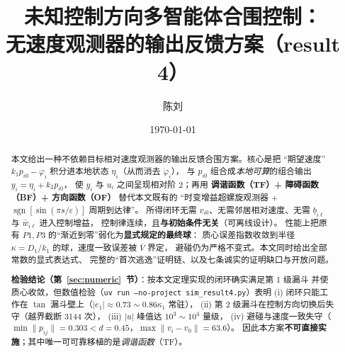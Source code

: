 \documentclass[11pt,a4paper]{article}
\title{\bfseries 未知控制方向多智能体合围控制：\\[2pt]
无速度观测器的输出反馈方案（result 4）}
\author{陈\quad 刘}
\date{\today}
\newcommand{\ub}{\underline{b}}
\newcommand{\sgn}{\operatorname{sgn}}
\theoremstyle{plain}
\theoremstyle{definition}
\theoremstyle{remark}
\begin{document}
\maketitle

\begin{abstract}
\sloppy
本文给出一种不依赖目标相对速度观测器的输出反馈合围方案。核心是把
“期望速度” $k_1p_{i0}-\varphi_i$ 积分进本地状态 $\eta_i$（从而消去 $\dot\varphi_i$），
与 $p_{i0}$ 组合成\emph{本地可算}的组合输出 $y_i=\eta_i+k_2p_{i0}$，
使 $y_i$ 与 $u_i$ 之间呈现相对阶 $2$；再用
\textbf{调谐函数（TF）+ 障碍函数（BF）+ 方向函数（OF）}
替代本文既有的
“时变增益超螺旋观测器 + $\sgn[\sin(\pi s/\varepsilon)]$ 周期到达律”。
所得闭环无需 $v_{i0}$、无需邻居相对速度、无需 $\ub_{i\ell}$ 与 $\bar w_{i\ell}$ 进入控制增益，
控制律连续，且\textbf{与初始条件无关}（可离线设计）。
性能上把原有 $P1,P3$ 的“渐近到零”弱化为\textbf{显式规定的最终球}：
质心误差指数收敛到半径 $\kappa=D_1/k_1$ 的球，速度一致误差被 $\bar V$ 界定，
避碰仍为严格不变式。本文同时给出全部常数的显式表达式、
完整的“首次逃逸”证明链、以及七条诚实的证明缺口与开放问题。

\smallskip
\noindent\textbf{检验结论（第~\ref{sec:numeric}~节）}：按本文定理实现的闭环确实满足第 1 级漏斗
并使质心收敛，但数值检验（\texttt{uv run --no-project sim\_result4.py}）表明
(i) 闭环只能工作在 $\tan$ 漏斗壁上（$|e_1|\approx0.73\sim0.86\kappa_1$ 常驻），
(ii) 第 2 级漏斗在控制方向切换后失守（越界截断 3144 次），
(iii) $|u|$ 峰值达 $10^3\sim10^4$ 量级，
(iv) 避碰与速度一致失守（$\min\|p_{ij}\|=0.303<d=0.45$，$\max\|v_i-v_0\|=63.6$）。
因此本方案\textbf{不可直接实施}；其中唯一可可靠移植的是\emph{调谐函数}（TF）。
\end{abstract}

\tableofcontents

\end{document}
